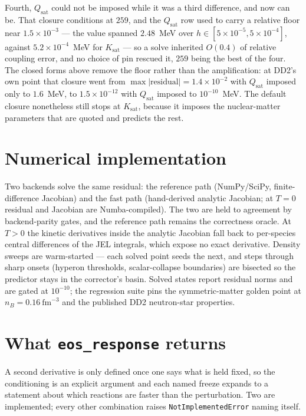 \documentclass[aps,prc,onecolumn,superscriptaddress,nofootinbib,10pt]{revtex4-2}
\newcommand{\nB}{n_B}
\begin{document}
Fourth, $Q_{\mathrm{sat}}$ could not be imposed while it was a third
difference, and now can be. That closure conditions at $259$, and the
$Q_{\mathrm{sat}}$ row used to carry a relative floor near
$1.5\times 10^{-3}$ --- the value spanned $2.48$~MeV over
$h \in [5\times 10^{-5}, 5\times 10^{-4}]$, against $5.2\times 10^{-4}$~MeV
for $K_{\mathrm{sat}}$ --- so a solve inherited $O(0.4)$ of relative coupling
error, and no choice of pin rescued it, $259$ being the best of the four. The
closed forms above remove the floor rather than the amplification: at DD2's
own point that closure went from $\max|\mathrm{residual}| = 1.4\times 10^{-2}$
with $Q_{\mathrm{sat}}$ imposed only to $1.6$~MeV, to $1.5\times 10^{-12}$
with $Q_{\mathrm{sat}}$ imposed to $10^{-10}$~MeV. The default closure
nonetheless still stops at $K_{\mathrm{sat}}$, because it imposes the
nuclear-matter parameters that are quoted and predicts the rest.

\section{Numerical implementation}
\label{sec:numerics}

Two backends solve the same residual: the reference path (NumPy/SciPy,
finite-difference Jacobian) and the fast path (hand-derived analytic
Jacobian; at $T=0$ residual and Jacobian are Numba-compiled). The two are
held to agreement by backend-parity gates, and the reference path remains the
correctness oracle. At $T>0$ the kinetic derivatives inside the analytic
Jacobian fall back to per-species central differences of the JEL integrals,
which expose no exact derivative. Density sweeps are warm-started --- each
solved point seeds the next, and steps through sharp onsets (hyperon
thresholds, scalar-collapse boundaries) are bisected so the predictor stays
in the corrector's basin. Solved states report residual norms and are gated
at $10^{-10}$; the regression suite pins the symmetric-matter golden point at
$\nB = 0.16\ \mathrm{fm}^{-3}$ and the published DD2 neutron-star properties.

\section{What \texttt{eos\_response} returns}
\label{sec:response}

A second derivative is only defined once one says what is held fixed, so the
conditioning is an explicit argument and each named freeze expands to a
statement about which reactions are faster than the perturbation. Two are
implemented; every other combination raises \texttt{NotImplementedError}
naming itself.
\end{document}
